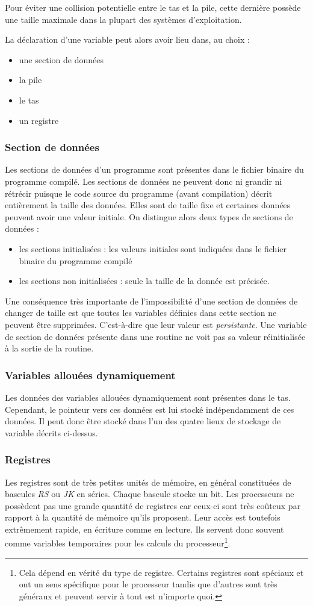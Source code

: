 \documentclass[../../../main.tex]{subfiles}
\begin{document}
Pour éviter une collision potentielle entre le tas et la pile, cette dernière possède une taille maximale dans la plupart des systèmes d'exploitation.

La déclaration d'une variable peut alors avoir lieu dans, au choix :
\begin{itemize}
	\item une section de données
	\item la pile
	\item le tas
	\item un registre
\end{itemize}
\subsubsection{Section de données}
Les sections de données d'un programme sont présentes dans le fichier binaire du programme compilé. Les sections de données ne peuvent donc ni grandir ni rétrécir puisque le code source du programme (avant compilation) décrit entièrement la taille des données. Elles sont de taille fixe et certaines données peuvent avoir une valeur initiale. On distingue alors deux types de sections de données :
\begin{itemize}
	\item les sections initialisées : les valeurs initiales sont indiquées dans le fichier binaire du programme compilé
	\item les sections non initialisées : seule la taille de la donnée est précisée.
\end{itemize}
Une conséquence très importante de l'impossibilité d'une section de données de changer de taille est que toutes les variables définies dans cette section ne peuvent être supprimées. C'est-à-dire que leur valeur est \textit{persistante}. Une variable de section de données présente dans une routine ne voit pas sa valeur réinitialisée à la sortie de la routine.
\subsubsection{Variables allouées dynamiquement}
Les données des variables allouées dynamiquement sont présentes dans le tas. Cependant, le pointeur vers ces données est lui stocké indépendamment de ces données. Il peut donc être stocké dans l'un des quatre lieux de stockage de variable décrits ci-dessus.
\subsubsection{Registres}
Les registres sont de très petites unités de mémoire, en général constituées de bascules \textit{RS} ou \textit{JK} en séries. Chaque bascule stocke un bit. Les processeurs ne possèdent pas une grande quantité de registres car ceux-ci sont très coûteux par rapport à la quantité de mémoire qu'ils proposent. Leur accès est toutefois extrêmement rapide, en écriture comme en lecture. Ils servent donc souvent comme variables temporaires pour les calculs du processeur\footnote{Cela dépend en vérité du type de registre. Certains registres sont spéciaux et ont un sens spécifique pour le processeur tandis que d'autres sont très généraux et peuvent servir à tout est n'importe quoi.}.
\end{document}
